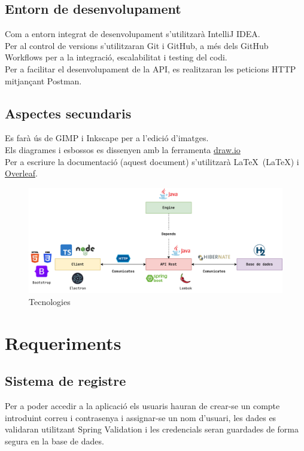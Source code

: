 \subsection{Entorn de desenvolupament}
Com a entorn integrat de desenvolupament s’utilitzarà IntelliJ IDEA.
\\[3mm]
Per al control de versions s’utilitzaran Git i GitHub, a més dels GitHub Workflows per a la integració, escalabilitat i testing del codi.
\\[3mm]
Per a facilitar el desenvolupament de la API, es realitzaran les peticions HTTP mitjançant Postman.
\subsection{Aspectes secundaris}
Es farà ús de GIMP i Inkscape per a l’edició d’imatges.
\\[3mm]
Els diagrames i esbossos es dissenyen amb la ferramenta  \href{https://app.diagrams.net/}{draw.io}
\\[3mm]
Per a escriure la documentació (aquest document) s’utilitzarà \LaTeX\ (LaTeX) i \href{https://www.overleaf.com/}{Overleaf}.

\begin{figure}[H]
    \centering
    \includegraphics[width=\textwidth]{images/tecnologies.png}
    \caption{Tecnologies}
    \label{fig:Arquitectura}
\end{figure}
\section{Requeriments}
\subsection{Sistema de registre}
Per a poder accedir a la aplicació els usuaris hauran de crear-se un compte introduint correu i contrasenya i assignar-se un nom d'usuari, les dades es validaran utilitzant Spring Validation i les credencials seran guardades de forma segura en la base de dades.
